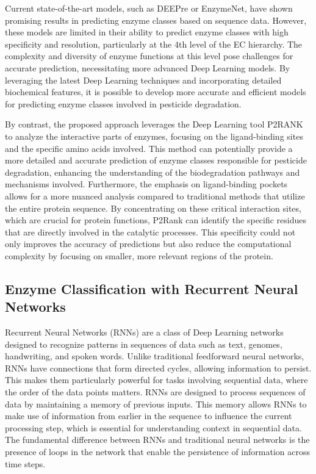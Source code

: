 Current state-of-the-art models, such as DEEPre or EnzymeNet, have shown promising results in predicting enzyme classes based on sequence data. However, these models are limited in their ability to predict enzyme classes with high specificity and resolution, particularly at the 4th level of the EC hierarchy. The complexity and diversity of enzyme functions at this level pose challenges for accurate prediction, necessitating more advanced Deep Learning models. By leveraging the latest Deep Learning techniques and incorporating detailed biochemical features, it is possible to develop more accurate and efficient models for predicting enzyme classes involved in pesticide degradation.

By contrast, the proposed approach leverages the Deep Learning tool P2RANK to analyze the interactive parts of enzymes, focusing on the ligand-binding sites and the specific amino acids involved. This method can potentially provide a more detailed and accurate prediction of enzyme classes responsible for pesticide degradation, enhancing the understanding of the biodegradation pathways and mechanisms involved. Furthermore, the emphasis on ligand-binding pockets allows for a more nuanced analysis compared to traditional methods that utilize the entire protein sequence. By concentrating on these critical interaction sites, which are crucial for protein functions, P2Rank can identify the specific residues that are directly involved in the catalytic processes. This specificity could not only improves the accuracy of predictions but also reduce the computational complexity by focusing on smaller, more relevant regions of the protein. \autocite{krivakP2RankMachineLearning2018}

\subsection{Enzyme Classification with Recurrent Neural Networks}
\label{sec:Enzyme Classification with Recurrent Neural Networks}

Recurrent Neural Networks (RNNs) are a class of Deep Learning networks designed to recognize patterns in sequences of data such as text, genomes, handwriting, and spoken words. Unlike traditional feedforward neural networks, RNNs have connections that form directed cycles, allowing information to persist. This makes them particularly powerful for tasks involving sequential data, where the order of the data points matters. RNNs are designed to process sequences of data by maintaining a memory of previous inputs. This memory allows RNNs to make use of information from earlier in the sequence to influence the current processing step, which is essential for understanding context in sequential data. The fundamental difference between RNNs and traditional neural networks is the presence of loops in the network that enable the persistence of information across time steps. \autocite{schmidtRecurrentNeuralNetworks2019}

